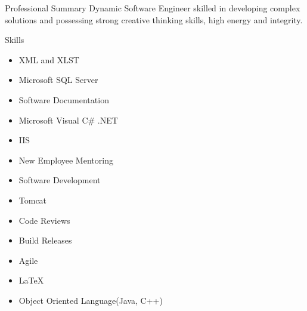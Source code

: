 \documentclass{resume} %
\begin{document}

\begin{rSection}{Professional Summary} 
Dynamic Software Engineer skilled in developing complex solutions and possessing strong creative thinking skills, high energy and integrity.
\end{rSection}


\begin{rSection}{Skills}
\begin{multicols}{2}
\begin{enumerate}
\begin{itemize}
\item XML and XLST
\item Microsoft SQL Server
\item Software Documentation
\item Microsoft Visual C\# .NET
\item IIS
\item New Employee Mentoring
\item Software Development
\item Tomcat
\item Code Reviews
\item Build Releases
\item Agile
\item LaTeX
\item Object Oriented Language(Java, C++)
\end{itemize}
\end{enumerate}
\end{multicols}
\end{rSection}

\end{document}
